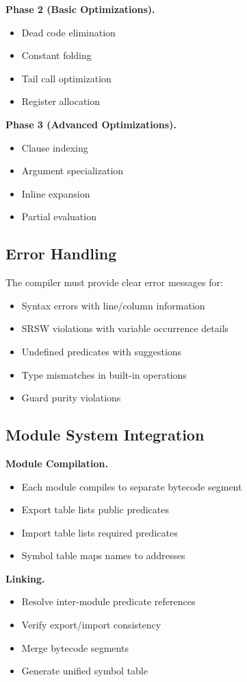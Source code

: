 \documentclass[runningheads,thm-restate]{llncs}
\newcommand{\mypara}[1]{\smallskip\noindent\textbf{#1.}}
\begin{document}
\mypara{Phase 2 (Basic Optimizations)}
\begin{itemize}
\item Dead code elimination
\item Constant folding
\item Tail call optimization
\item Register allocation
\end{itemize}

\mypara{Phase 3 (Advanced Optimizations)}
\begin{itemize}
\item Clause indexing
\item Argument specialization
\item Inline expansion
\item Partial evaluation
\end{itemize}

\subsection{Error Handling}

The compiler must provide clear error messages for:
\begin{itemize}
\item Syntax errors with line/column information
\item SRSW violations with variable occurrence details
\item Undefined predicates with suggestions
\item Type mismatches in built-in operations
\item Guard purity violations
\end{itemize}

\subsection{Module System Integration}

\mypara{Module Compilation}
\begin{itemize}
\item Each module compiles to separate bytecode segment
\item Export table lists public predicates
\item Import table lists required predicates
\item Symbol table maps names to addresses
\end{itemize}

\mypara{Linking}
\begin{itemize}
\item Resolve inter-module predicate references
\item Verify export/import consistency
\item Merge bytecode segments
\item Generate unified symbol table
\end{itemize}
\end{document}
